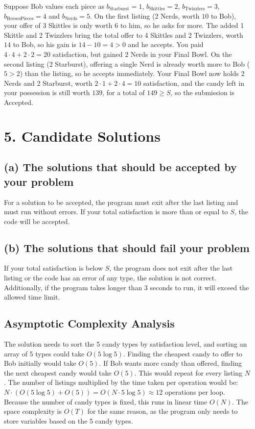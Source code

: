 \documentclass[11pt]{article}
\begin{document}
Suppose Bob values each piece as $b_{\text{Starburst}} = 1$,
$b_{\text{Skittles}} = 2$, $b_{\text{Twizzlers}} = 3$,
$b_{\text{ReesesPieces}} = 4$ and $b_{\text{Nerds}} = 5$. On the first listing
(2 Nerds, worth $10$ to Bob), your offer of 3 Skittles is only worth $6$ to
him, so he asks for more. The added 1 Skittle and 2 Twizzlers bring the total
offer to 4 Skittles and 2 Twizzlers, worth $14$ to Bob, so his gain is
$14 - 10 = 4 > 0$ and he accepts. You paid $4 \cdot 4 + 2 \cdot 2 = 20$
satisfaction, but gained 2 Nerds in your Final Bowl. On the second listing
(2 Starburst), offering a single Nerd is already worth more to Bob
($5 > 2$) than the listing, so he accepts immediately. Your Final Bowl now
holds 2 Nerds and 2 Starburst, worth $2 \cdot 1 + 2 \cdot 4 = 10$
satisfaction, and the candy left in your possession is still worth $139$,
for a total of $149 \ge S$, so the submission is Accepted.

\section*{5. Candidate Solutions}

\subsection*{(a) The solutions that should be accepted by your problem}

For a solution to be accepted, the program must exit after the last listing
and must run without errors. If your total satisfaction is more than or equal
to $S$, the code will be accepted.

\subsection*{(b) The solutions that should fail your problem}

If your total satisfaction is below $S$, the program does not exit after the
last listing or the code has an error of any type, the solution is not
correct. Additionally, if the program takes longer than 3 seconds to run, it
will exceed the allowed time limit.

\subsection*{Asymptotic Complexity Analysis}

The solution needs to sort the 5 candy types by satisfaction level, and
sorting an array of 5 types could take $O(5 \log 5)$. Finding the cheapest
candy to offer to Bob initially would take $O(5)$. If Bob wants more candy
than offered, finding the next cheapest candy would take $O(5)$. This would
repeat for every listing $N$. The number of listings multiplied by the time
taken per operation would be: $N \cdot (O(5 \log 5) + O(5)) = O(N \cdot
5\log 5) \approx 12$ operations per loop. Because the number of candy types
is fixed, this runs in linear time $O(N)$. The space complexity is $O(T)$ for
the same reason, as the program only needs to store variables based on the 5
candy types.
\end{document}
